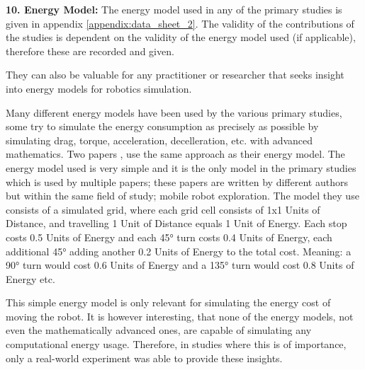 \vspace{5mm}

\noindent\textbf{10. Energy Model:}
The energy model used in any of the primary studies is given in appendix \ref{appendix:data_sheet_2}.
The validity of the contributions of the studies is dependent on the validity of the energy model used (if applicable), 
therefore these are recorded and given.

\vspace{2mm}

They can also be valuable for any practitioner or researcher that seeks insight into energy models for robotics simulation.

\vspace{8mm}

Many different energy models have been used by the various primary studies, some try to simulate the energy consumption 
as precisely as possible by simulating drag, torque, acceleration, decelleration, etc. with advanced mathematics. 
Two papers \cite{patel2012exploration_strategy, mei2006mobile_exploration}, use the same approach as their energy model.
The energy model used is very simple and it is the only model in the primary studies which is used by multiple papers;
these papers are written by different authors but within the same field of study; mobile robot exploration.
The model they use consists of a simulated grid, where each grid cell consists of 1x1 Units of Distance, 
and travelling 1 Unit of Distance equals 1 Unit of Energy.
Each stop costs 0.5 Units of Energy and each 45° turn costs 0.4 Units of Energy, each additional 45° adding another 
0.2 Units of Energy to the total cost.
Meaning: a 90° turn would cost 0.6 Units of Energy and a 135° turn would cost 0.8 Units of Energy etc.

\vspace{2mm}

This simple energy model is only relevant for simulating the energy cost of moving the robot.
It is however interesting, that none of the energy models, not even the mathematically advanced ones, are capable of 
simulating any computational energy usage.
Therefore, in studies where this is of importance, only a real-world experiment was able to provide these insights.


